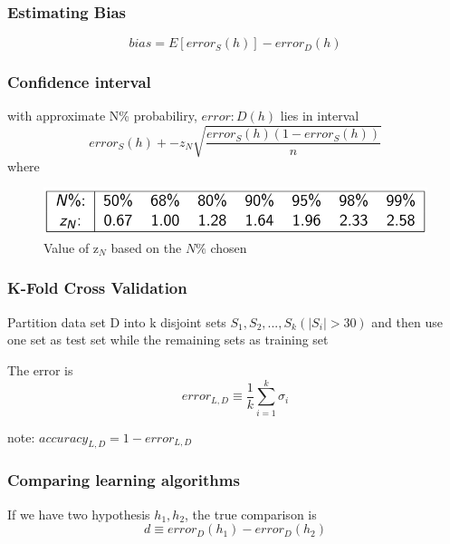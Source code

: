 \subsubsection{Estimating Bias}

\begin{equation}
    bias = E[error_S (h)] - error_D (h)
\end{equation}

\subsubsection{Confidence interval}
with approximate N\% probabiliry, $error:D (h)$ lies in interval
\begin{equation}
    error_S (h) +- z_{N} \sqrt{\frac{error_S(h) (1-error_S(h))}{n}}
\end{equation}
where
\begin{figure}[H]
    \centering
    \includegraphics[width=12cm,keepaspectratio]{images/Classification Evaluation/Screenshot_20221004_125528.png}
    \caption{Value of z$_{N}$  based on the $N\%$ chosen}
    \label{fig:z_N}
\end{figure}

\subsubsection{K-Fold Cross Validation}

Partition data set D into k disjoint sets $S_1, S_2, . . . , S_k (|S_i| > 30)$ and then use one set as test set while the remaining sets as training set

The error is
\begin{equation}
    error_{L,D} \equiv \frac{1}{k}\sum_{i = 1}^{k}\sigma_i
\end{equation}

note: $accuracy_{L,D} = 1 - error_{L, D}$

\subsubsection{Comparing learning algorithms}

If we have two hypothesis $h_1, h_2$, the true comparison is
\begin{equation}
    d \equiv error_D (h_1) - error_D (h_2)
\end{equation}

